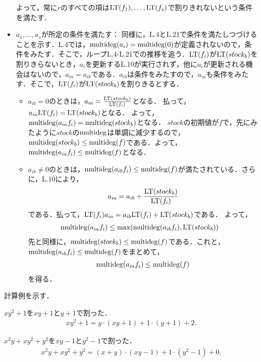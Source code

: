 \documentclass[9pt]{ltjsarticle}
\begin{document}
\begin{myproof}
\begin{itemize}
よって，常に$r$のすべての項は${\rm LT}(f_1),\dots,{\rm LT}(f_s)$で割りきれないという条件を満たす．
  \item $a_1,\dots,a_s$が所定の条件を満たす：
同様に，L.4とL.21で条件を満たしつづけることを示す．L.4では，$\mathrm{multideg}(a_i)=\mathrm{multideg}(0)$が定義されないので，条件をみたす．そこで，ループL.4-L.21での推移を追う．${\rm LT}(f_i)$が${\rm LT}(stock_b)$を割りきらないとき，$a_i$を更新するL.10が実行されず，他に$a_i$が更新される機会はないので，$a_{ia}=a_{ib}$である．$a_{ib}$は条件をみたすので，$a_{ia}$も条件をみたす．そこで，${\rm LT}(f_i)$が${\rm LT}(stock_b)$を割りきるとする．
\begin{itemize}
 \item
$a_{ib}=0$のときは，$a_{ia}=\frac{{\rm LT}(stock_b)}{{\rm LT}(f_i)}$となる．
払って，$a_{ia}{\rm LT}(f_i) = {\rm LT}(stock_b)$となる．
よって，$\mathrm{multideg}(a_{ia} f_i)=\mathrm{multideg}(stock_b)$となる．
$stock$の初期値が$f$で，先にみたように$stock$の$\mathrm{multideg}$は単調に減少するので，
$\mathrm{multideg}(stock_b) \le \mathrm{multideg}(f)$である．よって，$\mathrm{multideg}(a_{ia}f_i) \le \mathrm{multideg}(f)$となる．
 \item $a_{ib}\neq 0$のときは，$\mathrm{multideg}(a_{ib}f_i)\le \mathrm{multideg}(f)$が満たされている．さらに，L.10により，
\begin{align}
 a_{ia} = a_{ib} + \frac{{\rm LT}(stock_b)}{{\rm LT}(f_i)}
\end{align}
である．払って，${\rm LT}(f_i)a_{ia} = a_{ib}{\rm LT}(f_i) + {\rm LT}(stock_b)$である．
よって，
\begin{align}
 \mathrm{multideg}(a_{ia} f_i)
&\le \max(\mathrm{multideg}(a_{ib}f_i),{\rm LT}(stock_b))
\end{align}
先と同様に，$\mathrm{multideg}(stock_b)\le \mathrm{multideg}(f)$である．これと，$\mathrm{multideg}(a_{ib}f_i)\le \mathrm{multideg}(f)$をまとめて，
\begin{align}
 \mathrm{multideg}(a_{ia}f_i) \le \mathrm{multideg}(f)
\end{align}
を得る．
\end{itemize}
 \end{itemize}
\end{myproof}

計算例を示す．



$xy^2+1$を$xy+1$と$y+1$で割った．
\begin{align}
 xy^2 +1 = y\cdot (xy+1) + 1\cdot (y+1) + 2.
\end{align}


$x^2y+xy^2 + y^2$を$xy-1$と$y^2-1$で割った．
\begin{align}
 x^2y + xy^2 + y^2 = (x+y)\cdot (xy-1) + 1\cdot (y^2-1) + 0.
\end{align}
\end{document}
